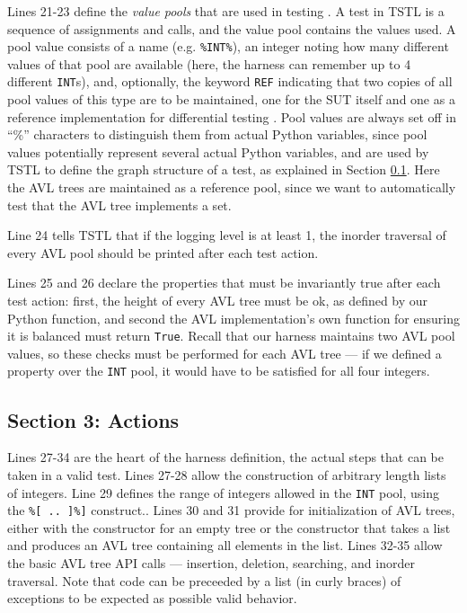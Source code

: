 \documentclass{sig-alternate}
\begin{document}
Lines 21-23 define the \emph{value pools} that are used in testing
\cite{AndrewsTR,UDITA}.  A test in TSTL is a sequence of assignments
and calls, and the value pool contains the values used.  A pool value
consists of a name (e.g. {\tt \%INT\%}), an integer noting how many
different values of that pool are available (here, the harness can
remember up to 4 different {\tt INT}s), and, optionally, the keyword
{\tt REF} indicating that two copies of all pool values of this type
are to be maintained, one for the SUT itself and one as a reference
implementation for differential testing \cite{Differential,ICSEDiff}.
Pool values are always set off in ``\%'' characters to distinguish
them from actual Python variables, since pool values potentially
represent several actual Python variables, and are used by TSTL to
define the graph structure of a test, as explained in Section \ref{sec:actions}.
Here the AVL trees are maintained as a reference pool, since we want
to automatically test that the AVL tree implements a set.

Line 24 tells TSTL that if the logging level is at least 1, the
inorder traversal of every AVL pool should be printed after each test
action.

Lines 25 and 26 declare the properties that must be invariantly true
after each test action:  first, the height of every AVL tree must be
ok, as defined by our Python function, and second the AVL
implementation's own function for ensuring it is balanced must return
{\tt True}.  Recall that our harness maintains two AVL pool values, so
these checks must be performed for each AVL tree --- if we defined a
property over the {\tt INT} pool, it would have to be satisfied for
all four integers.

\subsection{Section 3: Actions}
\label{sec:actions}

Lines 27-34 are the heart of the harness definition, the actual steps
that can be taken in a valid test.  Lines 27-28 allow the construction
of arbitrary length lists of integers.  Line 29 defines the range of
integers allowed in the {\tt INT} pool, using the {\tt \%[ .. ]\%]}
construct..  Lines 30 and 31 provide for initialization of AVL trees,
either with the constructor for an empty tree or the constructor that
takes a list and produces an AVL tree containing all elements in the
list.  Lines 32-35 allow the basic AVL tree API calls --- insertion,
deletion, searching, and inorder traversal.  Note that code can be
preceeded by a list (in curly braces) of exceptions to be expected as possible valid
behavior.
\end{document}
